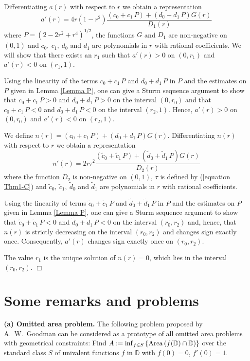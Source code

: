 \documentclass[mn,a4paper,fleqn]{w-art}
\begin{document}
{Differentiating $a(r)$ with respect to $r$ we
obtain a representation
$$a'(r) = 4r(1-r^2)\frac{(c_0 + c_1\,P)+(d_0 + d_1\,P)G(r)}{D_1(r)}$$
where $P = (2-2r^2+r^4)^{1/2}$, the functions $G$ and $D_1$ are
non-negative on $(0,1)$ and $c_0, \ c_1, \ d_0$ and $d_1$ are
polynomials in $r$ with rational coefficients. We will show that
there exists an $r_1$ such that $a'(r) > 0$ on $(0,r_1)$ and $a'(r) <
0$ on $(r_1,1)$.

Using the linearity of the terms
$c_0 + c_1\,P$ and $d_0 + d_1\,P$ in $P$ and the estimates on $P$ given in
Lemma \ref{Lemma P}, one can give a Sturm sequence argument to show that
$c_0 + c_1\,P > 0$ and $d_0 + d_1\,P > 0$ on the interval $(0,r_0)$ and that
$c_0 + c_1\,P < 0$ and $d_0 + d_1\,P < 0$ on the interval $(r_2,1)$.  Hence,
$a'(r) > 0$ on $(0,r_0)$ and $a'(r) < 0$ on $(r_2,1)$.

We define $n(r) = (c_0 + c_1\,P)+(d_0 + d_1\,P)G(r)$.  Differentiating $n(r)$ with respect to $r$
we obtain a representation
$$n'(r) = 2r\tau^2\frac{({\tilde c}_0 + {\tilde c}_1\,P)+({\tilde d}_0 + {\tilde d}_1\,P)G(r)}{D_2(r)}$$
where the function $D_2$ is non-negative on $(0,1)$, $\tau$ is
defined by (\ref{equation Thm1-C}) and ${\tilde c}_0, \ {\tilde
c}_1, \ {\tilde d}_0$ and ${\tilde d}_1$ are polynomials in $r$
with rational coefficients.

Using the linearity of terms
${\tilde c}_0 + {\tilde c}_1\,P$ and ${\tilde d}_0 + {\tilde d}_1\,P$ in $P$ and
the estimates on $P$ given in
Lemma \ref{Lemma P}, one can give a Sturm sequence argument to show that
${\tilde c}_0 + {\tilde c}_1\,P < 0$ and ${\tilde d}_0 + {\tilde d}_1\,P < 0$ on the
interval $(r_0,r_2)$ and, hence, that $n(r)$ is strictly decreasing on the interval $(r_0,r_2)$ and
changes sign exactly once. Consequently, $a'(r)$ changes sign exactly once on $(r_0,r_2)$.

The value $r_1$ is the unique solution of $n(r) = 0$, which lies in the interval $(r_0,r_2)$.
\hfill  $\Box$  %


\section{Some remarks and problems}  %
\setcounter{equation}{0} %

\textbf{(a) Omitted area problem.} The following problem proposed
by A.~W.~Goodman \cite{G} can be considered as a prototype of all
omitted area problems with geometrical constraints:
Find $A:=\inf_{f\in S} \,\{ {\rm{Area}}\,(f(\mathbb{D})\cap
\mathbb{D})\}$ over the standard class $S$ of univalent functions
$f$ in $\mathbb{D}$ with $f(0)=0$, $f'(0)=1$.

}
\end{document}

